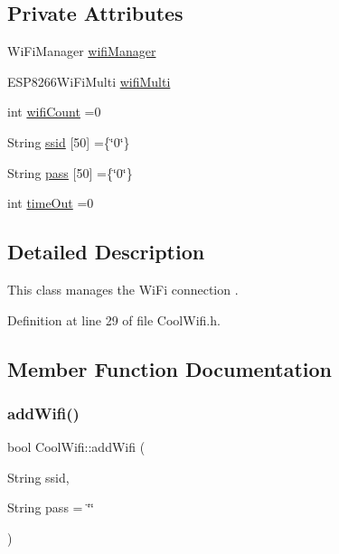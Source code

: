 \subsection*{Private Attributes}
\begin{DoxyCompactItemize}
\item 
Wi\+Fi\+Manager \hyperlink{classCoolWifi_a80dd24fdc56e863f5eb9947dd65a433a}{wifi\+Manager}
\item 
E\+S\+P8266\+Wi\+Fi\+Multi \hyperlink{classCoolWifi_a7862a8c0d7239877e2956c14a368aab8}{wifi\+Multi}
\item 
int \hyperlink{classCoolWifi_ab133bd92fcb895b884deecd6678592e4}{wifi\+Count} =0
\item 
String \hyperlink{classCoolWifi_a893b21d0fed821438733bba2e73fb4c2}{ssid} \mbox{[}50\mbox{]} =\{\char`\"{}0\char`\"{}\}
\item 
String \hyperlink{classCoolWifi_a0c3332a149245aaad060b32593a54c9b}{pass} \mbox{[}50\mbox{]} =\{\char`\"{}0\char`\"{}\}
\item 
int \hyperlink{classCoolWifi_a952111605f25156588b5632caaba1c6f}{time\+Out} =0
\end{DoxyCompactItemize}


\subsection{Detailed Description}
This class manages the Wi\+Fi connection . 

Definition at line 29 of file Cool\+Wifi.\+h.



\subsection{Member Function Documentation}
\mbox{\label{classCoolWifi_a914d7a1df14dd6b75345fb614c34e9d6}} 
\subsubsection{\texorpdfstring{add\+Wifi()}{addWifi()}}
{\footnotesize\ttfamily bool Cool\+Wifi\+::add\+Wifi (\begin{DoxyParamCaption}\item[{String}]{ssid,  }\item[{String}]{pass = {\ttfamily \char`\"{}\char`\"{}} }\end{DoxyParamCaption})}

